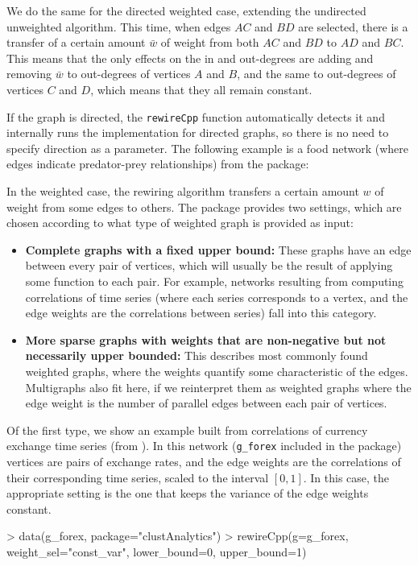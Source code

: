 We do the same for the directed weighted case, extending the undirected unweighted algorithm. This time, when edges $AC$ and $BD$ are selected, there is a transfer of a certain amount $\bar{w}$ of weight from both $AC$ and $BD$ to $AD$ and $BC$. This means that the only effects on the in and out-degrees are adding and removing $\bar{w}$ to out-degrees of vertices $A$ and $B$, and the same to out-degrees of vertices $C$ and $D$, which means that  they all remain constant.

If the graph is directed, the \texttt{rewireCpp} function automatically detects it and internally runs the implementation for directed graphs, so there is no need to specify direction as a parameter. The following example is a food network (where edges indicate predator-prey relationships) from the  package:

In the weighted case, the rewiring algorithm transfers a certain amount $w$ of weight from some edges to others. The package provides two settings, which  are chosen according to what type of weighted graph is provided as input:
\begin{itemize}
    \item \textbf{Complete graphs with a fixed upper bound:} These graphs have an edge between every pair of vertices, which will usually be the result of applying some function to each pair. For example, networks resulting from computing correlations of time series (where each series corresponds to a vertex, and the edge weights are the correlations between series) fall into this category.
    \item \textbf{More sparse graphs with weights that are non-negative but not necessarily upper bounded:} This describes most commonly found weighted graphs, where the weights quantify some characteristic of the edges. Multigraphs also fit here, if we reinterpret them as weighted graphs where the edge weight is the number of parallel edges between each pair of vertices.
\end{itemize}
Of the first type, we show an example built from correlations of currency exchange time series (from \cite{arratia2021clustering}). In this network 
({\tt g\_forex} included in the package) vertices are pairs of exchange rates, and the edge weights are the correlations of their corresponding time series, scaled to the interval $[0,1]$. In this case, the appropriate setting is the one that keeps the variance of the edge weights constant.
\begin{example}
> data(g_forex, package="clustAnalytics")
> rewireCpp(g=g_forex, weight_sel="const_var", lower_bound=0, upper_bound=1)
\end{example}

